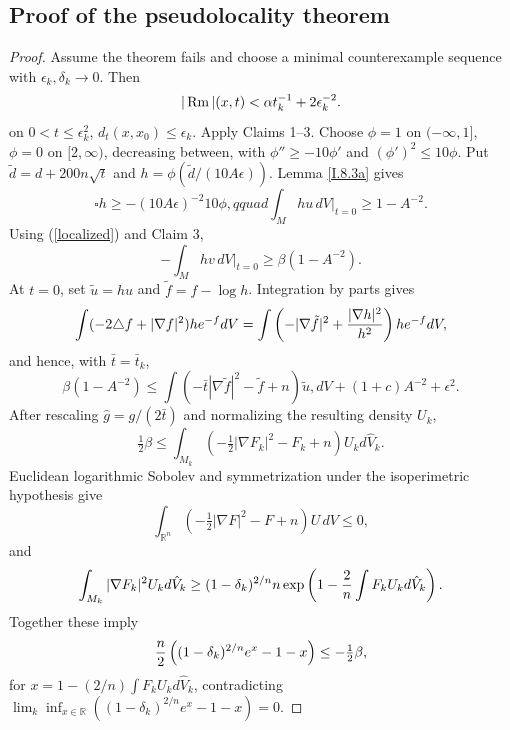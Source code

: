 \subsection{Proof of the pseudolocality theorem}
 \label{pfI.10.1}
\begin{proof}
\sketch
Assume the theorem fails and choose a minimal counterexample sequence with
$\epsilon_k,\delta_k\to0$. Then
\begin{equation}\label{largebound}|\operatorname{Rm}|(x,t)<\alpha t_k^{-1}+2\epsilon_k^{-2}.\end{equation}
on $0<t\le\epsilon_k^2$, $d_t(x,x_0)\le\epsilon_k$. Apply Claims 1--3.
Choose $\phi=1$ on $(-\infty,1]$, $\phi=0$ on $[2,\infty)$, decreasing between,
with $\phi''\ge-10\phi'$ and $(\phi')^2\le10\phi$. Put
$\tilde d=d+200n\sqrt t$ and $h=\phi(\tilde d/(10A\epsilon))$. Lemma
\ref{I.8.3a} gives
\begin{equation}\square h\ge-(10A\epsilon)^{-2}10\phi,qquad
\int_Mhu\,dV\big|_{t=0}\ge1-A^{-2}.\label{ut}
\end{equation}
Using (\ref{localized}) and Claim 3,
\begin{equation}-\int_Mhv\,dV\big|_{t=0}\ge\beta(1-A^{-2}).\end{equation}
At $t=0$, set $\tilde u=hu$ and $\tilde f=f-\log h$. Integration by parts gives
\begin{equation}
\int(-2\triangle f+|\nabla f|^2)he^{-f}dV
=\int\left(-|\nabla\tilde f|^2+{|\nabla h|^2\over h^2}\right)he^{-f}dV,
\end{equation}
and hence, with $\bar t=\bar t_k$,
\begin{equation}\label{somme}
\beta(1-A^{-2})\le\int(-\bar t|\nabla\tilde f|^2-\tilde f+n)\tilde u,dV+(1+c)A^{-2}+\epsilon^2.
\end{equation}
After rescaling $\hat g=g/(2\bar t)$ and normalizing the resulting density $U_k$,
\begin{equation}\label{contra1}
\tfrac12\beta\le\int_{M_k}\left(-\tfrac12|\nabla F_k|^2-F_k+n\right)U_kd\hat V_k.
\end{equation}
Euclidean logarithmic Sobolev and symmetrization under the isoperimetric hypothesis
give
\begin{equation}\label{Beckner}\int_{\mathbb R^n}(-\tfrac12|\nabla F|^2-F+n)U\,dV\le0,
\end{equation}
and
\begin{equation}\label{contra2}
\int_{M_k}|\nabla F_k|^2U_kd\hat V_k\ge(1-\delta_k)^{2/n}n\exp\left(1-{2\over n}\int F_kU_kd\hat V_k\right).
\end{equation}
Together these imply
\begin{equation}
{n\over2}\left((1-\delta_k)^{2/n}e^x-1-x\right)\le-\tfrac12\beta,
\end{equation}
for $x=1-(2/n)\int F_kU_kd\hat V_k$, contradicting
$\lim_k\inf_{x\in\mathbb R}((1-\delta_k)^{2/n}e^x-1-x)=0$.
\end{proof}


